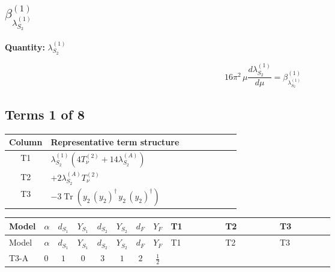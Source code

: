 \documentclass[8pt]{article}
\begin{document}
\begin{landscape}
\section*{$\beta_{\lambda_{S_2}^{(1)}}^{(1)}$}
\noindent\textbf{Quantity: }$\lambda_{S_2}^{(1)}$\par\smallskip
\[16\pi^2\,\mu\frac{d \lambda_{S_2}^{(1)}}{d\mu}=\beta_{\lambda_{S_2}^{(1)}}^{(1)}\]
\subsection*{Terms 1 of 8}
\begin{center}
\begin{tabular}{@{}c >{\raggedright\arraybackslash}p{0.82\linewidth}@{}}
\toprule
Column & Representative term structure \\
\midrule
T1 & \(\displaystyle {\lambda_{S_2}^{(1)}} (4 T_{\nu}^{(2)}+14 {\lambda_{S_2}^{(A)}})\) \\
\midrule
T2 & \(\displaystyle +2 {\lambda_{S_2}^{(A)}} T_{\nu}^{(2)}\) \\
\midrule
T3 & \(\displaystyle -3 \operatorname{Tr}\!\left({y_2}\,\left({y_2}\right)^{\dagger}\,{y_2}\,\left({y_2}\right)^{\dagger}\right)\) \\
\midrule
\bottomrule
\end{tabular}
\end{center}
\smallskip
\tiny
\begin{longtable}{@{}llcccccc >{\raggedright\arraybackslash}p{0.21\linewidth} >{\raggedright\arraybackslash}p{0.21\linewidth} >{\raggedright\arraybackslash}p{0.21\linewidth}@{}}
\toprule
Model & $\alpha$ & $d_{S_1}$ & $Y_{S_1}$ & $d_{S_2}$ & $Y_{S_2}$ & $d_F$ & $Y_F$ & T1 & T2 & T3 \\
\midrule
\endfirsthead
\toprule
Model & $\alpha$ & $d_{S_1}$ & $Y_{S_1}$ & $d_{S_2}$ & $Y_{S_2}$ & $d_F$ & $Y_F$ & T1 & T2 & T3 \\
\midrule
\endhead
T3-A & $0$ & $1$ & $0$ & $3$ & $1$ & $2$ & $\frac{1}{2}$ & \scriptsize\adjustbox{max width=\linewidth}{$\begin{gathered} {\lambda_{S_2}^{(1)}} (4 T_{\nu}^{(2)}+14 {\lambda_{S_2}^{(A)}})\end{gathered}$} & \scriptsize\adjustbox{max width=\linewidth}{$\begin{gathered} +2 {\lambda_{S_2}^{(A)}} T_{\nu}^{(2)}\end{gathered}$} & \scriptsize\adjustbox{max width=\linewidth}{$\begin{gathered} -3 \operatorname{Tr}\!\left({y_2}\,\left({y_2}\right)^{\dagger}\,{y_2}\,\left({y_2}\right)^{\dagger}\right)\end{gathered}$} \\

\end{longtable}
\end{landscape}
\end{document}
